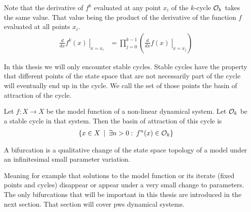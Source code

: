 Note that the derivative of $f^k$ evaluated at any point $x_i$ of the $k$-cycle $\mathcal{O}_k$ takes the same value.
That value being the product of the derivative of the function $f$ evaluated at all points $x_i$.
\begin{align}
	\left. \frac{d}{dx}f^k(x) \:\right|_{x = x_i} & = \prod_{j=0}^{k-1} \left( \left. \frac{d}{dx} f(x) \:\right|_{x = x_j} \right)
\end{align}

In this thesis we will only encounter stable cycles.
Stable cycles have the property that different points of the state space that are not necessarily part of the cycle will eventually end up in the cycle.
We call the set of those points the basin of attraction of the cycle.

\begin{definition}
	Let $f: X \to X$ be the model function of a non-linear dynamical system.
	Let $\mathcal{O}_k$ be a stable cycle in that system.
	Then the basin of attraction of this cycle is
	\begin{align}
		\left\{x \in X \:\mid\: \exists n > 0: \:f^n(x) \in \mathcal{O}_k\right\}
	\end{align}
\end{definition}

\begin{definition}[Bifurcation]
	A bifurcation is a qualitative change of the state space topology of a model under an infinitesimal small parameter variation.
\end{definition}
Meaning for example that solutions to the model function or its iterate (fixed points and cycles) disappear or appear under a very small change to parameters.
The only bifurcations that will be important in this thesis are introduced in the next section.
That section will cover \gls{pws} dynamical systems.
